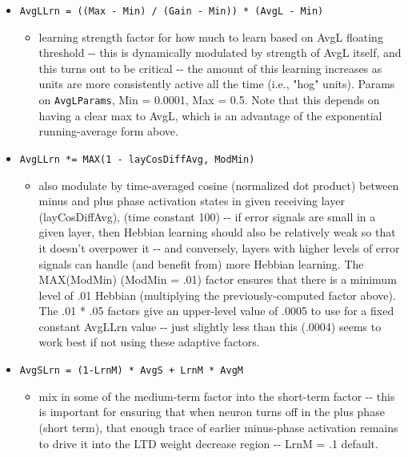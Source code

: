 \documentclass[10pt,letterpaper]{article}
\begin{document}
\begin{itemize}
  \item \texttt{AvgLLrn\ =\ ((Max\ -\ Min)\ /\ (Gain\ -\ Min))\ *\ (AvgL\ -\ Min)}

    \begin{itemize}
	
    \item
      learning strength factor for how much to learn based on AvgL
      floating threshold -\/- this is dynamically modulated by strength
      of AvgL itself, and this turns out to be critical -\/- the amount
      of this learning increases as units are more consistently active
      all the time (i.e., "hog" units). Params on \texttt{AvgLParams},
      Min = 0.0001, Max = 0.5. Note that this depends on having a clear
      max to AvgL, which is an advantage of the exponential
      running-average form above.
    \end{itemize}
	
  \item \texttt{AvgLLrn\ *=\ MAX(1\ -\ layCosDiffAvg,\ ModMin)}

    \begin{itemize}
	
    \item
      also modulate by time-averaged cosine (normalized dot product)
      between minus and plus phase activation states in given receiving
      layer (layCosDiffAvg), (time constant 100) -\/- if error signals
      are small in a given layer, then Hebbian learning should also be
      relatively weak so that it doesn't overpower it -\/- and
      conversely, layers with higher levels of error signals can handle
      (and benefit from) more Hebbian learning. The MAX(ModMin) (ModMin
      = .01) factor ensures that there is a minimum level of .01 Hebbian
      (multiplying the previously-computed factor above). The .01 * .05
      factors give an upper-level value of .0005 to use for a fixed
      constant AvgLLrn value -\/- just slightly less than this (.0004)
      seems to work best if not using these adaptive factors.
    \end{itemize}
	
  \item \texttt{AvgSLrn\ =\ (1-LrnM)\ *\ AvgS\ +\ LrnM\ *\ AvgM}

    \begin{itemize}
	
    \item
      mix in some of the medium-term factor into the short-term factor
      -\/- this is important for ensuring that when neuron turns off in
      the plus phase (short term), that enough trace of earlier
      minus-phase activation remains to drive it into the LTD weight
      decrease region -\/- LrnM = .1 default.
    \end{itemize}
	

\end{itemize}
\end{document}
